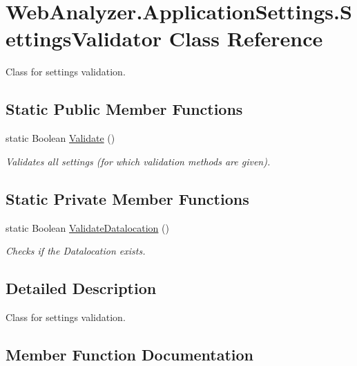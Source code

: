 \hypertarget{class_web_analyzer_1_1_application_settings_1_1_settings_validator}{}\section{Web\+Analyzer.\+Application\+Settings.\+Settings\+Validator Class Reference}
\label{class_web_analyzer_1_1_application_settings_1_1_settings_validator}


Class for settings validation.  


\subsection*{Static Public Member Functions}
\begin{DoxyCompactItemize}
\item 
static Boolean \hyperlink{class_web_analyzer_1_1_application_settings_1_1_settings_validator_ad9d6638c1a3ebb0b123d6fae005c657a}{Validate} ()
\begin{DoxyCompactList}\small\item\em Validates all settings (for which validation methods are given). \end{DoxyCompactList}\end{DoxyCompactItemize}
\subsection*{Static Private Member Functions}
\begin{DoxyCompactItemize}
\item 
static Boolean \hyperlink{class_web_analyzer_1_1_application_settings_1_1_settings_validator_a734f765786368247956035a592805156}{Validate\+Datalocation} ()
\begin{DoxyCompactList}\small\item\em Checks if the Datalocation exists. \end{DoxyCompactList}\end{DoxyCompactItemize}


\subsection{Detailed Description}
Class for settings validation. 



\subsection{Member Function Documentation}
\hypertarget{class_web_analyzer_1_1_application_settings_1_1_settings_validator_ad9d6638c1a3ebb0b123d6fae005c657a}{}
